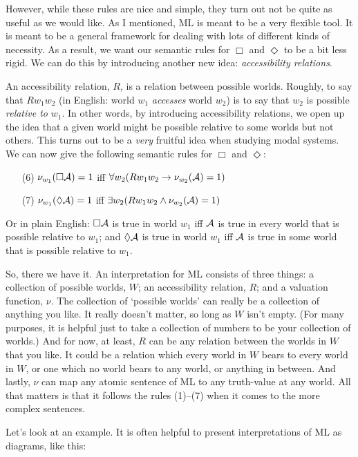 However, while these rules are nice and simple, they turn out not be quite as useful as we would like. As I mentioned, ML is meant to be a very flexible tool. It is meant to be a general framework for dealing with lots of different kinds of necessity. As a result, we want our semantic rules for $\Box$ and $\Diamond$ to be a bit less rigid. We can do this by introducing another new idea: \emph{accessibility relations}.

An accessibility relation, $R$, is a relation between possible worlds. Roughly, to say that $Rw_1w_2$ (in English: world $w_1$ \emph{accesses} world $w_2$) is to say that $w_2$ is possible \emph{relative to} $w_1$. In other words, by introducing accessibility relations, we open up the idea that a given world might be possible relative to some worlds but not others. This turns out to be a \emph{very} fruitful idea when studying modal systems. We can now give the following semantic rules for $\Box$ and $\Diamond$:
\begin{itemize}
\item[(6)]$\nu_{w_1}(\Box \mathcal{A})=1$ iff $\forall w_2 (Rw_1w_2\rightarrow \nu_{w_2}(\mathcal{A})=1)$
\item[(7)]$\nu_{w_1}(\Diamond \mathcal{A})=1$ iff $\exists w_2 (Rw_1w_2\wedge \nu_{w_2}(\mathcal{A})=1)$
\end{itemize}
Or in plain English: $\Box\mathcal{A}$ is true in world $w_1$ iff $\mathcal{A}$ is true in every world that is possible relative to $w_1$; and $\Diamond\mathcal{A}$ is true in world $w_1$ iff $\mathcal{A}$ is true in some world that is possible relative to $w_1$.

So, there we have it. An interpretation for ML consists of three things: a collection of possible worlds, $W$; an accessibility relation, $R$; and a valuation function, $\nu$. The collection of `possible worlds' can really be a collection of anything you like. It really doesn't matter, so long as $W$ isn't empty. (For many purposes, it is helpful just to take a collection of numbers to be your collection of worlds.) And for now, at least, $R$ can be any relation between the worlds in $W$ that you like. It could be a relation which every world in $W$ bears to every world in $W$, or one which no world bears to any world, or anything in between. And lastly, $\nu$ can map any atomic sentence of ML to any truth-value at any world. All that matters is that it follows the rules (1)--(7) when it comes to the more complex sentences.

Let's look at an example. It is often helpful to present interpretations of ML as diagrams, like this:
\begin{center}
\end{center}

